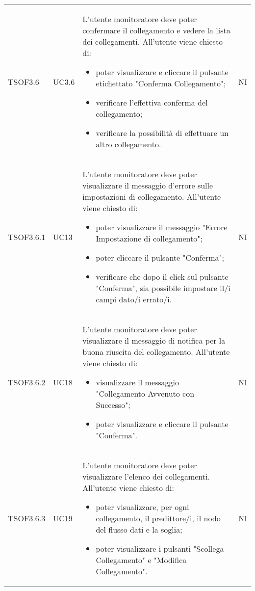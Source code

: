 \begin{longtable}{C{2.5cm} C{2.5cm} L{8cm} C{2cm}}
TSOF3.6 &
UC3.6 &
L'utente monitoratore deve poter confermare il collegamento e vedere la lista dei collegamenti. All'utente viene chiesto di:
\begin{itemize}
	\item poter visualizzare e cliccare il pulsante etichettato "Conferma Collegamento";
	\item verificare l'effettiva conferma del collegamento;
	\item verificare la possibilità di effettuare un altro collegamento.
\end{itemize}&
NI \\

TSOF3.6.1 &
UC13 &
L'utente monitoratore deve poter visualizzare il messaggio d'errore sulle impostazioni di collegamento. All'utente viene chiesto di:
\begin{itemize}
	\item poter visualizzare il messaggio "Errore Impostazione di collegamento";
	\item poter cliccare il pulsante "Conferma";
	\item verificare che dopo il click sul pulsante "Conferma", sia possibile impostare il/i campi dato/i errato/i.
\end{itemize}&
NI \\
TSOF3.6.2 &
UC18 &
L'utente monitoratore deve poter visualizzare il messaggio di notifica per la buona riuscita del collegamento. All'utente viene chiesto di:
\begin{itemize}
	\item visualizzare il messaggio "Collegamento Avvenuto con Successo";
	\item poter visualizzare e cliccare il pulsante "Conferma".
\end{itemize} &
NI \\

TSOF3.6.3 &
UC19 &
L'utente monitoratore deve poter visualizzare l'elenco dei collegamenti. All'utente viene chiesto di:
\begin{itemize}
	\item poter visualizzare, per ogni collegamento, il predittore/i, il nodo del flusso dati e la soglia;
	\item poter visualizzare i pulsanti "Scollega Collegamento" e "Modifica Collegamento".
\end{itemize}&
NI \\



\end{longtable}
